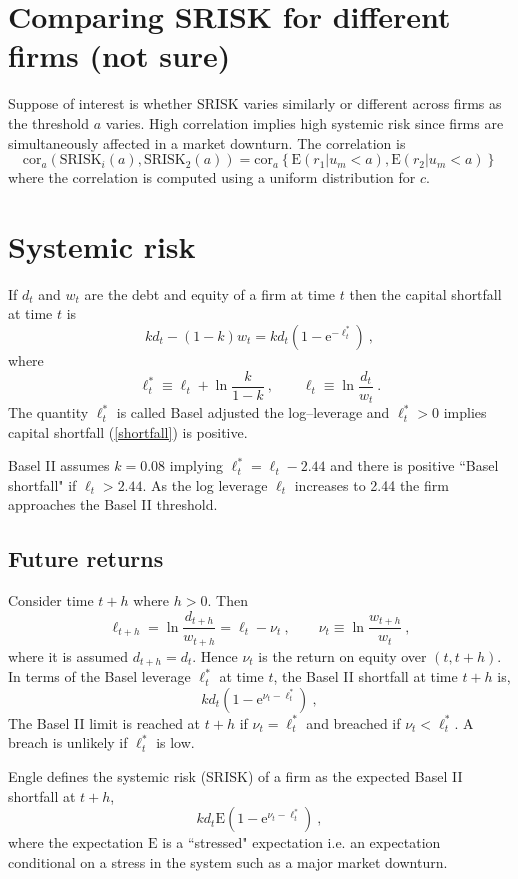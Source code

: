 \documentclass[authoryear]{elsarticle}
\newcommand{\E}{\mathrm{E}}
\newcommand{\e}{\mathrm{e}}
\newcommand{\cor}{\mathrm{cor}}
\newcommand{\eref}[1]{(\ref{#1})}
\newcommand{\cq}{\ , \qquad}
\newcommand{\be}[1]{\begin{equation}\label{#1}}
\newcommand{\ee}{\end{equation}}
\begin{document}
\section{Comparing SRISK for different firms (not sure)}

Suppose of interest is whether SRISK varies similarly or different across firms as the threshold $a$ varies. High correlation implies high systemic risk since firms are simultaneously affected in a market downturn. The correlation is
$$
\cor_a\left( \mathrm{SRISK}_i(a), \mathrm{SRISK}_2(a)\right) = \cor_a \left\{\E(r_1|u_m < a),\E(r_2|u_m < a)   \right\}
$$
where the correlation is computed using a uniform distribution for $c$. 


\section{Systemic risk}

If $d_t$ and $w_t$ are the debt and equity of a firm at time $t$ then the capital shortfall at time $t$ is 
\be{shortfall}
kd_t  - (1-k) w_t = kd_t\left(1-\e^{-\ell^*_t}\right)\ ,
\ee
where 
$$
\ell^*_t \equiv \ell_t + \ln \frac{k}{1-k}\cq \ell_t \equiv \ln\frac{d_t}{w_t}\ .
$$
The quantity $\ell^*_t$ is called Basel adjusted the log--leverage and $\ell^*_t>0$ implies capital shortfall \eref{shortfall} is positive. 


Basel II assumes $k=0.08$ implying $\ell_t^*=\ell_t-2.44$  and there is  positive  ``Basel shortfall"  if
$\ell_t > 2.44$.
As the log leverage $\ell_t$  increases to 2.44 the firm approaches the Basel II threshold. 

\subsection{Future returns}

Consider  time  $t+h$ where $h>0$.  Then
$$
\ell_{t+h} = \ln \frac{d_{t+h}}{w_{t+h}} = \ell_t -\nu_{t}\cq \nu_t\equiv \ln\frac{w_{t+h}}{w_t}  \ ,
$$
where it is assumed $d_{t+h}=d_t$.  Hence $\nu_{t}$ is the return on equity over $(t,t+h)$. 
In terms of the Basel leverage $\ell_t^*$ at time $t$, the  Basel II shortfall  at time $t+h$ is,
\be{bs}
kd_t(1-\e^{\nu_{t}-\ell^*_t})\ , 
\ee 
The Basel II limit is reached at $t+h$ if $\nu_{t}=\ell_t^*$ and  breached  if
$
\nu_{t}< \ell_t^*
$.
A breach is  unlikely if $\ell^*_t$ is low.


Engle defines the systemic risk (SRISK) of a firm as the expected Basel II shortfall at $t+h$,
$$
k d_t\E(1-\e^{\nu_t-\ell^*_t}) \ ,
$$
where the expectation $\E$ is a ``stressed" expectation i.e. an expectation conditional on a stress in the system such as a major market downturn.
\end{document}
